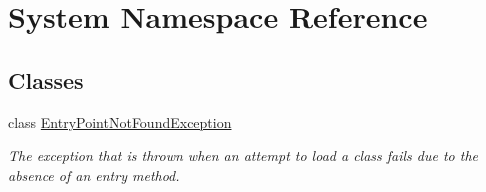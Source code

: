 \hypertarget{namespace_system}{}\section{System Namespace Reference}
\label{namespace_system}
\subsection*{Classes}
\begin{DoxyCompactItemize}
\item 
class \mbox{\hyperlink{class_system_1_1_entry_point_not_found_exception}{Entry\+Point\+Not\+Found\+Exception}}
\begin{DoxyCompactList}\small\item\em The exception that is thrown when an attempt to load a class fails due to the absence of an entry method. \end{DoxyCompactList}\end{DoxyCompactItemize}
